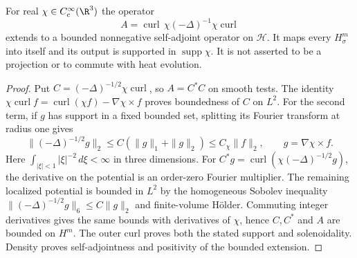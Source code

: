 \begin{lemma}\label{vf:localizer}
For real $\chi\in C_c^\infty(\R^3)$ the operator
\[
 A=\operatorname{curl}\,\chi(-\Delta)^{-1}\chi\operatorname{curl}
\]
extends to a bounded nonnegative self-adjoint operator on $\mathcal H$.
It maps every $H^m_\sigma$ into itself and its output is supported in
$\operatorname{supp}\chi$. It is not asserted to be a projection or to
commute with heat evolution.
\end{lemma}
\begin{proof}
Put $C=(-\Delta)^{-1/2}\chi\operatorname{curl}$, so $A=C^*C$ on smooth
tests. The identity
$\chi\operatorname{curl}f=\operatorname{curl}(\chi f)-\nabla\chi\times f$
proves boundedness of $C$ on $L^2$. For the second term, if $g$ has support
in a fixed bounded set, splitting its Fourier transform at radius one gives
\[
 \|(-\Delta)^{-1/2}g\|_2
 \le C(\|g\|_1+\|g\|_2)\le C_\chi\|f\|_2,
 \qquad g=\nabla\chi\times f.
\]
Here $\int_{|\xi|<1}|\xi|^{-2}\,d\xi<\infty$ in three dimensions.
For $C^*g=\operatorname{curl}(\chi(-\Delta)^{-1/2}g)$, the derivative
on the potential is an order-zero Fourier multiplier. The remaining
localized potential is bounded in $L^2$ by the homogeneous Sobolev
inequality $\|(-\Delta)^{-1/2}g\|_6\le C\|g\|_2$ and finite-volume
H\"older. Commuting integer derivatives gives the same bounds with
derivatives of $\chi$, hence $C,C^*$ and $A$ are bounded on $H^m$.
The outer curl proves both the stated support and solenoidality.
Density proves self-adjointness and positivity of the bounded extension.
\end{proof}

